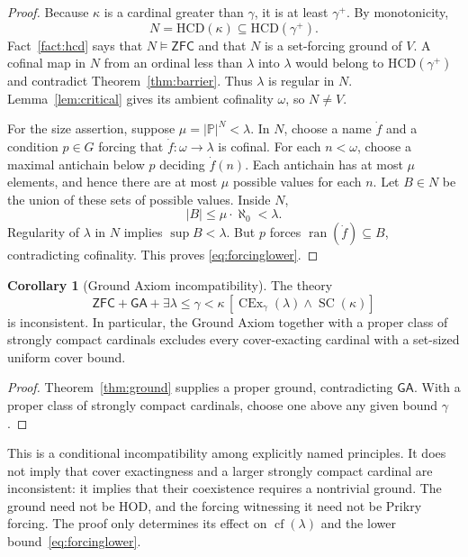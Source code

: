 \documentclass[11pt,letterpaper]{article}
\theoremstyle{definition}
\newtheorem{corollary}[definition]{Corollary}
\newcommand{\ZFC}{\mathsf{ZFC}}
\newcommand{\SC}{\operatorname{SC}}
\newcommand{\CEx}{\operatorname{CEx}}
\newcommand{\cf}{\operatorname{cf}}
\newcommand{\HCD}{\mathrm{HCD}}
\newcommand{\GA}{\mathsf{GA}}
\newcommand{\ran}{\operatorname{ran}}
\begin{document}
\begin{proof}
Because $\kappa$ is a cardinal greater than $\gamma$, it is at least
$\gamma^+$. By monotonicity,
\[
 N=\HCD(\kappa)\subseteq\HCD(\gamma^+).
\]
Fact~\ref{fact:hcd} says that $N\models\ZFC$ and that $N$ is a set-forcing
ground of $V$. A cofinal map in $N$ from an ordinal less than $\lambda$ into
$\lambda$ would belong to $\HCD(\gamma^+)$ and contradict
Theorem~\ref{thm:barrier}. Thus $\lambda$ is regular in $N$.
Lemma~\ref{lem:critical} gives its ambient cofinality $\omega$, so $N\neq V$.

For the size assertion, suppose $\mu=|\mathbb P|^N<\lambda$.
In $N$, choose a name $\dot f$ and a condition $p\in G$ forcing that
$\dot f:\omega\to\lambda$ is cofinal. For each $n<\omega$, choose a maximal
antichain below $p$ deciding $\dot f(n)$. Each antichain has at most $\mu$
elements, and hence there are at most $\mu$ possible values for each $n$.
Let $B\in N$ be the union of these sets of possible values. Inside $N$,
\[
 |B|\leq\mu\cdot\aleph_0<\lambda.
\]
Regularity of $\lambda$ in $N$ implies $\sup B<\lambda$. But $p$ forces
$\ran(\dot f)\subseteq B$, contradicting cofinality. This proves
\eqref{eq:forcinglower}.
\end{proof}

\begin{corollary}[Ground Axiom incompatibility]\label{cor:ga}
The theory
\begin{equation}\label{eq:ga}
 \ZFC+\GA+
 \exists\lambda\leq\gamma<\kappa\,
 [\CEx_\gamma(\lambda)\wedge\SC(\kappa)]
\end{equation}
is inconsistent. In particular, the Ground Axiom together with a proper class
of strongly compact cardinals excludes every cover-exacting cardinal with a
set-sized uniform cover bound.
\end{corollary}

\begin{proof}
Theorem~\ref{thm:ground} supplies a proper ground, contradicting $\GA$.
With a proper class of strongly compact cardinals, choose one above any
given bound $\gamma$.
\end{proof}

This is a conditional incompatibility among explicitly named principles.
It does not imply that cover exactingness and a larger strongly compact
cardinal are inconsistent: it implies that their coexistence requires a
nontrivial ground. The ground need not be HOD, and the forcing witnessing it
need not be Prikry forcing. The proof only determines its effect on
$\cf(\lambda)$ and the lower bound~\eqref{eq:forcinglower}.
\end{document}
